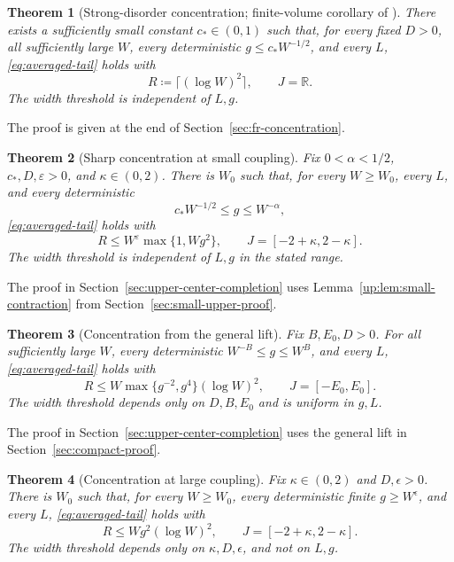 \documentclass[11pt]{article}
\numberwithin{equation}{section}
\newtheorem{theorem}{Theorem}[section]
\theoremstyle{remark}
\newcommand{\R}{\mathbb R}
\begin{document}
\begin{theorem}[Strong-disorder concentration; finite-volume corollary of
{\cite[Theorem~1]{PSSS}}]\label{thm:strong-upper}
There exists a sufficiently small constant $c_*\in(0,1)$ such that, for every fixed
$D>0$, all sufficiently large $W$, every deterministic
$g\le c_*W^{-1/2}$, and every $L$,
\eqref{eq:averaged-tail} holds with
\begin{equation}\label{eq:strong-radius}
 R\coloneqq\lceil(\log W)^2\rceil,\qquad J=\R.
\end{equation}
The width threshold is independent of $L,g$.
\end{theorem}

The proof is given at the end of Section~\ref{sec:fr-concentration}.

\begin{theorem}[Sharp concentration at small coupling]
\label{thm:sharp-small-upper}
Fix $0<\alpha<1/2$, $c_*,D,\varepsilon>0$, and
$\kappa\in(0,2)$. There is $W_0$ such that, for every
$W\ge W_0$, every $L$, and every deterministic
\[
 c_*W^{-1/2}\le g\le W^{-\alpha},
\]
\eqref{eq:averaged-tail} holds with
\begin{equation}\label{eq:sharp-small-radius}
 R\le W^\varepsilon\max\{1,Wg^2\},\qquad J=[-2+\kappa,2-\kappa].
\end{equation}
The width threshold is independent of $L,g$ in the stated range.
\end{theorem}

The proof in Section~\ref{sec:upper-center-completion} uses
Lemma~\ref{up:lem:small-contraction} from Section~\ref{sec:small-upper-proof}.

\begin{theorem}[Concentration from the general lift]
\label{thm:compact-upper}
Fix $B,E_0,D>0$. For all sufficiently large $W$, every deterministic
$W^{-B}\le g\le W^B$, and every $L$,
\eqref{eq:averaged-tail} holds with
\begin{equation}\label{eq:coarse-radius}
 R\le W\max\{g^{-2},g^4\}(\log W)^2,\qquad J=[-E_0,E_0].
\end{equation}
The width threshold depends only on $D,B,E_0$ and is uniform in $g,L$.
\end{theorem}

The proof in Section~\ref{sec:upper-center-completion} uses the general
lift in Section~\ref{sec:compact-proof}.

\begin{theorem}[Concentration at large coupling]
\label{thm:large-upper}
Fix $\kappa\in(0,2)$ and $D,\epsilon>0$.
There is $W_0$ such that, for every $W\ge W_0$, every deterministic
finite $g\ge W^\epsilon$, and every $L$,
\eqref{eq:averaged-tail} holds with
\begin{equation}\label{eq:large-radius}
 R\le Wg^2(\log W)^2,\qquad J=[-2+\kappa,2-\kappa].
\end{equation}
The width threshold depends only on
$\kappa,D,\epsilon$, and not on $L,g$.
\end{theorem}
\end{document}

